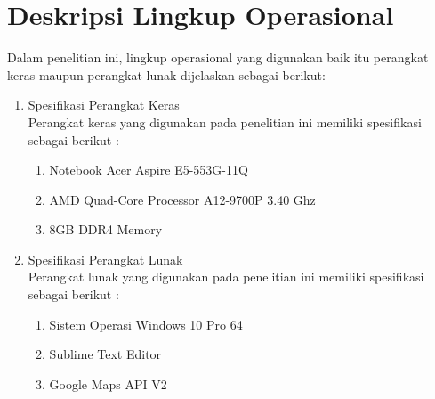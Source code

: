\section{Deskripsi Lingkup Operasional}
Dalam penelitian ini, lingkup operasional yang digunakan baik itu perangkat
keras maupun perangkat lunak dijelaskan sebagai berikut:
\begin{enumerate}
	\item Spesifikasi Perangkat Keras\\
	Perangkat keras yang digunakan pada penelitian ini memiliki spesifikasi sebagai berikut :
	\begin{enumerate}
		\item Notebook Acer Aspire E5-553G-11Q
		\item AMD Quad-Core Processor A12-9700P 3.40 Ghz
		\item 8GB DDR4 Memory
	\end{enumerate}
	\item Spesifikasi Perangkat Lunak\\
	Perangkat lunak yang digunakan pada penelitian ini memiliki spesifikasi sebagai berikut :
		\begin{enumerate}
		\item Sistem Operasi Windows 10 Pro 64
		\item Sublime Text Editor
		\item Google Maps API V2
	\end{enumerate}
\end{enumerate}
